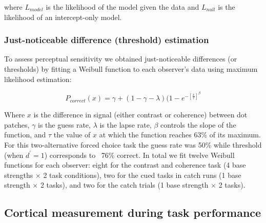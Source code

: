 where $L_{model}$ is the likelihood of the model given the data and $L_{null}$ is the likelihood of an intercept-only model.

\subsubsection{Just-noticeable difference (threshold) estimation}

To assess perceptual sensitivity we obtained just-noticeable differences (or thresholds) by fitting a Weibull function \citep{Wichmann2001-dm} to each observer’s data using maximum likelihood estimation:

\begin{equation}
    P_{correct}(x) = \gamma + (1 - \gamma - \lambda)(1 - e^{- [\frac{x}{\tau}]^{\beta}}
\end{equation}

Where $x$ is the difference in signal (either contrast or coherence) between dot patches, $\gamma$ is the guess rate, $\lambda$ is the lapse rate, $\beta$ controls the slope of the function, and $\tau$ the value of $x$ at which the function reaches 63\% of its maximum. For this two-alternative forced choice task the guess rate was 50\% while threshold (when $d^'=1$) corresponds to ~76\% correct. In total we fit twelve Weibull functions for each observer: eight for the contrast and coherence task (4 base strengths $\times$ 2 task conditions), two for the cued tasks in catch runs (1 base strength $\times$ 2 tasks), and two for the catch trials (1 base strength $\times$ 2 tasks).

\subsection{Cortical measurement during task performance}

